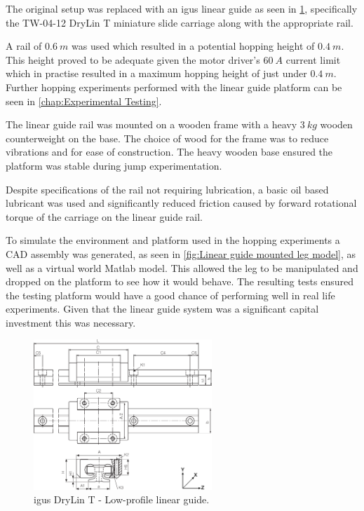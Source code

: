 The original setup was replaced with an igus linear guide as seen in \cref{fig:drylin-linear-guide}, specifically the TW-04-12 DryLin T miniature slide carriage along with the appropriate rail.

A rail of $0.6\ m$ was used which resulted in a potential hopping height of $0.4\ m$. This height proved to be adequate given the motor driver's $60\ A$ current limit which in practise resulted in a maximum hopping height of just under $0.4\ m$. Further hopping experiments performed with the linear guide platform can be seen in \cref{chap:Experimental Testing}.

The linear guide rail was mounted on a wooden frame with a heavy $3\ kg$ wooden counterweight on the base. The choice of wood for the frame was to reduce vibrations and for ease of construction. The heavy wooden base ensured the platform was stable during jump experimentation.

Despite specifications of the rail not requiring lubrication, a basic oil based lubricant was used and significantly reduced friction caused by forward rotational torque of the carriage on the linear guide rail.

To simulate the environment and platform used in the hopping experiments a CAD assembly was generated, as seen in \cref{fig:Linear guide mounted leg model}, as well as a virtual world Matlab model. This allowed the leg to be manipulated and dropped on the platform to see how it would behave. The resulting tests ensured the testing platform would have a good chance of performing well in real life experiments. Given that the linear guide system was a significant capital investment this was necessary.

\begin{figure}
\centering
\includegraphics[width=0.6\textwidth]{images/mechanical/drylin-linear-guide.png} 
\caption{igus DryLin T - Low-profile linear guide.}
\label{fig:drylin-linear-guide}
\end{figure}


